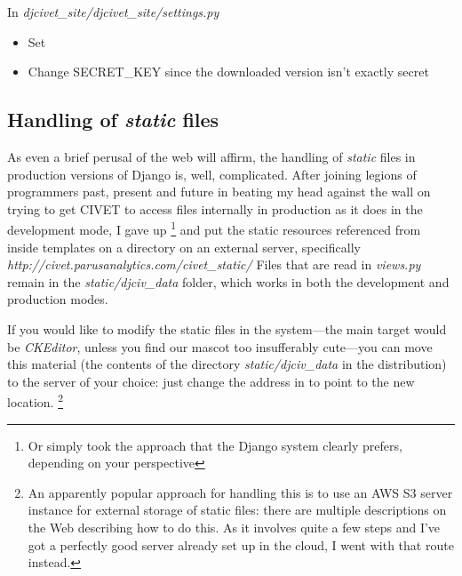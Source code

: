 \documentclass[letterpaper,10pt,english]{sphinxmanual}
\begin{document}
In \emph{djcivet\_site/djcivet\_site/settings.py}
\begin{itemize}
\item {} 
Set 

\item {} 
Change SECRET\_KEY since the downloaded version isn't exactly secret

\end{itemize}


\subsection{Handling of \emph{static} files}
\label{appendix5:handling-of-static-files}
As even a brief perusal of the web will affirm, the handling of \emph{static} files in production versions of
Django is, well, complicated. After joining legions of programmers past, present and future in beating my head against
the wall on trying to get CIVET to access files internally in production as it does in the development mode, I gave up \footnote{
Or simply took the approach that the Django system clearly prefers, depending on your perspective
}
and put the static resources referenced from inside templates on a directory on an external server, specifically
\emph{http://civet.parusanalytics.com/civet\_static/}  Files that are read in \emph{views.py} remain in the \emph{static/djciv\_data}
folder, which works in both the development and production modes.

If you would like to modify the static files in the system—the main target would be \emph{CKEditor}, unless you find our
mascot too insufferably cute—you can move this material (the contents of the directory \emph{static/djciv\_data} in the distribution) to
the server of your choice: just change the address in  to point to the new location. \footnote{
An apparently popular approach for handling this is to use an AWS S3 server instance for external storage of static files:
there are multiple descriptions on the Web describing how to do this. As it involves quite a few steps and I've
got a perfectly good server already set up in the cloud, I went with that route instead.
}
\end{document}
